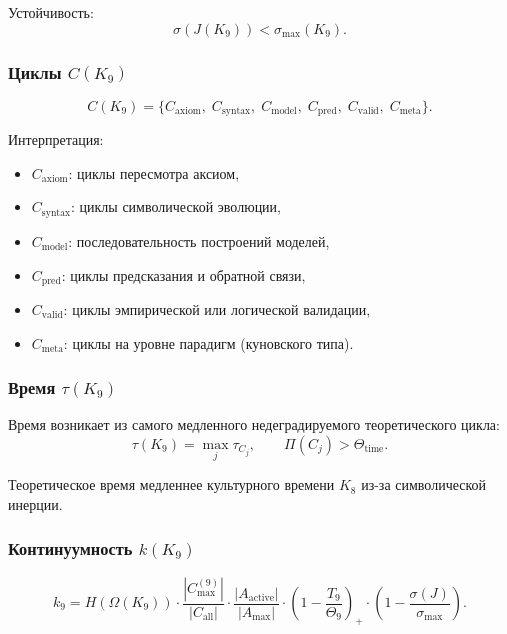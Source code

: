 Устойчивость:
\[
\sigma(J(K_9)) < \sigma_{\max}(K_9).
\]

\subsubsection{Циклы \texorpdfstring{$C(K_9)$}{C(K_9)}}

\[
C(K_9)=
\{
C_{\mathrm{axiom}},\;
C_{\mathrm{syntax}},\;
C_{\mathrm{model}},\;
C_{\mathrm{pred}},\;
C_{\mathrm{valid}},\;
C_{\mathrm{meta}}
\}.
\]

Интерпретация:
\begin{itemize}
    \item $C_{\mathrm{axiom}}$: циклы пересмотра аксиом,
    \item $C_{\mathrm{syntax}}$: циклы символической эволюции,
    \item $C_{\mathrm{model}}$: последовательность построений моделей,
    \item $C_{\mathrm{pred}}$: циклы предсказания и обратной связи,
    \item $C_{\mathrm{valid}}$: циклы эмпирической или логической валидации,
    \item $C_{\mathrm{meta}}$: циклы на уровне парадигм (куновского типа).
\end{itemize}

\subsubsection{Время \texorpdfstring{$\tau(K_9)$}{\tau(K_9)}}

Время возникает из самого медленного недеградируемого теоретического цикла:
\[
\tau(K_9)=\max_j \tau_{C_j},
\qquad
\Pi(C_j) > \Theta_{\mathrm{time}}.
\]

Теоретическое время медленнее культурного времени $K_8$ из-за символической инерции.

\subsubsection{Континуумность \texorpdfstring{$k(K_9)$}{k(K_9)}}

\[
k_9 =
H(\Omega(K_9))
\cdot
\frac{|C_{\max}^{(9)}|}{|C_{\mathrm{all}}|}
\cdot
\frac{|A_{\mathrm{active}}|}{|A_{\max}|}
\cdot
\left(1-\frac{T_9}{\Theta_9}\right)_+
\cdot
\left(1-\frac{\sigma(J)}{\sigma_{\max}}\right).
\]


